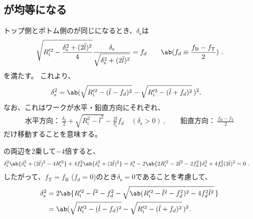 \subsection{\ReAlocationLength が均等になる\SpacerThickness}
トップ側とボトム側の\AlocationLength が同じになるとき、$\delta_\mathrm s$は
\begin{align}
  \label{eq:condtionequalalocationSpacer}
  \sqrt{R_\mathrm i'^2-\frac{\delta_\mathrm s^2+(2\bar l)^2}4}\frac{\delta_\mathrm s}{\sqrt{\delta_\mathrm s^2+(2\bar l)^2}} = f_d \qquad
  \ab(f_d \equiv \frac{f_\mathrm B-f_\mathrm T}2)\ .
\end{align}
を満たす。
これより、
\begin{align*}
  \delta_\mathrm s^2
  &= \ab(\sqrt{R_\mathrm i'^2-(\bar l-f_d)^2}-\sqrt{R_\mathrm i'^2-(\bar l+f_d)^2}\,)^2.
\end{align*}
なお、これはワークが水平・鉛直方向にそれぞれ、
\begin{align*}
  \text{水平方向：}~\frac{\delta_\mathrm s}2+\sqrt{R_\mathrm i^2-\bar l^2}-\frac{2\bar l}{\delta_\mathrm s}f_d\quad(\delta_\mathrm s>0)\ , \qquad
  \text{鉛直方向：}~\frac{f_\mathrm B-f_\mathrm T}2
\end{align*}
だけ移動することを意味する。
\begin{hosoku}
の両辺を2乗して$-4$倍すると、
\begin{align*}
  \delta_\mathrm s^2\ab\{\delta_\mathrm s^2+(2\bar l)^2-4R_\mathrm i'^2\}+4f_d^2\ab\{\delta_\mathrm s^2+(2\bar l)^2\}
  & = \delta_\mathrm s^4-2\ab\{2R_\mathrm i'^2-2\bar l^2-2f_d^2\}\delta_\mathrm s^2+4f_d^2(2\bar l)^2
    = 0\ .
\end{align*}
したがって、$f_\mathrm T = f_\mathrm B$ ($f_d = 0$)のとき$\delta_\mathrm s = 0$であることを考慮して、
\begin{align*}
  \delta_\mathrm s^2
  &= 2\ab\{
       R_\mathrm i'^2-\bar l^2-f_d^2-\sqrt{\ab(R_\mathrm i'^2-\bar l^2-f_d^2)^2-4f_d^2\bar l^2}\,
     \}\\
  &= \ab(\sqrt{R_\mathrm i'^2-(\bar l-f_d)^2}-\sqrt{R_\mathrm i'^2-(\bar l+f_d)^2}\,)^2.
\end{align*}
\end{hosoku}
